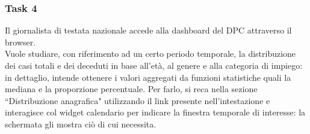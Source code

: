 \subsubsection{Task 4}
\label{sss:cw-task-4}

Il giornalista di testata nazionale accede alla dashboard del DPC attraverso il browser.\\
Vuole studiare, con riferimento ad un certo periodo temporale, la distribuzione dei casi totali e dei deceduti in base all'età, al genere e alla categoria di impiego: in dettaglio, intende ottenere i valori aggregati da funzioni statistiche quali la mediana e la proporzione percentuale.
Per farlo, si reca nella sezione ``Distribuzione anagrafica" utilizzando il link presente nell'intestazione e interagisce col widget calendario per indicare la finestra temporale di interesse: la schermata gli mostra ciò di cui necessita.